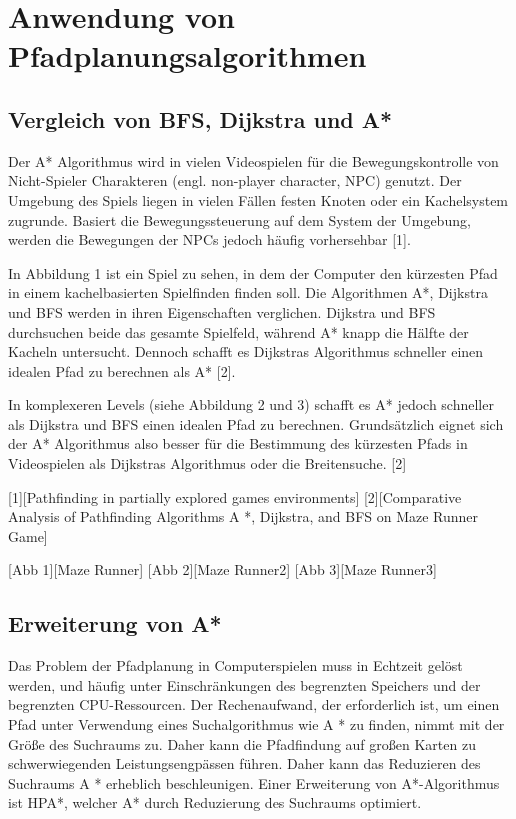 \chapter{Anwendung von Pfadplanungsalgorithmen}


\section{Vergleich von BFS, Dijkstra und A*}

Der A* Algorithmus wird in vielen Videospielen für die Bewegungskontrolle von Nicht-Spieler Charakteren (engl. non-player character, NPC) genutzt. Der Umgebung des Spiels liegen in vielen Fällen festen Knoten oder ein Kachelsystem zugrunde. Basiert die Bewegungssteuerung auf dem System der Umgebung, werden die Bewegungen der NPCs jedoch häufig vorhersehbar [1].

In Abbildung 1 ist ein Spiel zu sehen, in dem der Computer den kürzesten Pfad in einem kachelbasierten Spielfinden finden soll. Die Algorithmen A*, Dijkstra und BFS werden in ihren Eigenschaften verglichen. Dijkstra und BFS durchsuchen beide das gesamte Spielfeld, während A* knapp die Hälfte der Kacheln untersucht. Dennoch schafft es Dijkstras Algorithmus schneller einen idealen Pfad zu berechnen als A* [2].

In komplexeren Levels (siehe Abbildung 2 und 3) schafft es A* jedoch schneller als Dijkstra und BFS einen idealen Pfad zu berechnen. Grundsätzlich eignet sich der A* Algorithmus also besser für die Bestimmung des kürzesten Pfads in Videospielen als Dijkstras Algorithmus oder die Breitensuche. [2]

[1][Pathfinding in partially explored games environments]
[2][Comparative Analysis of Pathfinding Algorithms A *, Dijkstra, and BFS on Maze Runner Game]

[Abb 1][Maze Runner]
[Abb 2][Maze Runner2]
[Abb 3][Maze Runner3]


\section{Erweiterung von A*}
Das Problem der Pfadplanung in Computerspielen muss in Echtzeit gelöst werden, und  häufig unter Einschränkungen des begrenzten Speichers und der begrenzten CPU-Ressourcen. Der Rechenaufwand, der erforderlich ist, um einen Pfad unter Verwendung eines Suchalgorithmus wie A * zu finden, nimmt mit der Größe des Suchraums zu. Daher kann die Pfadfindung auf großen Karten zu schwerwiegenden Leistungsengpässen führen. Daher kann das Reduzieren des Suchraums A * erheblich beschleunigen. Einer Erweiterung von A*-Algorithmus ist HPA*, welcher A* durch Reduzierung des Suchraums optimiert\cite{hpa}. %

